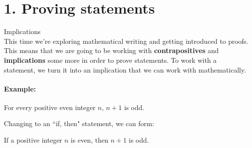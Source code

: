 \documentclass[a4paper,12pt]{book}
\title{}
\author{Rachel Morris}
\date{\today}
\begin{document}
    \toggletrue{answerkey}
    

    \section*{1. Proving statements}

        \begin{intro}{Implications} ~\\
            This time we're exploring mathematical writing and getting introduced
            to proofs. This means that we are going to be working with
            \textbf{contrapositives} and \textbf{implications} some more
            in order to prove statements.
            To work with a statement, we turn it into an implication that
            we can work with mathematically.
            
            \paragraph{Example:}
            For every positive even integer $n$, $n+1$ is odd.
            
            Changing to an ``if, then" statement, we can form:
            
            If a positive integer $n$ is even, then $n+1$ is odd.
        \end{intro}
\end{document}
